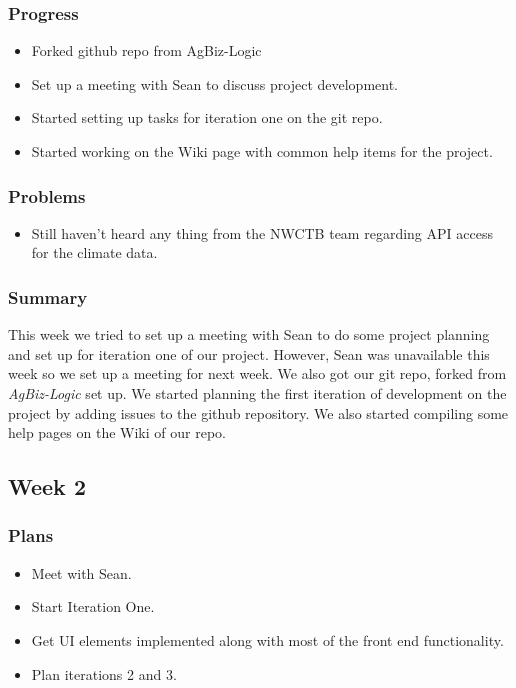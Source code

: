 \documentclass[onecolumn, draftclsnofoot,10pt, compsoc]{article}
\begin{document}
			\subsubsection{Progress}
				\begin{itemize}
					\item Forked github repo from AgBiz-Logic
					\item Set up a meeting with Sean to discuss project development.
					\item Started setting up tasks for iteration one on the git repo.
					\item Started working on the Wiki page with common help items for the project.
				\end{itemize}
			\subsubsection{Problems}
				\begin{itemize}
					\item Still haven't heard any thing from the NWCTB team regarding API access for the climate data.
				\end{itemize}

			\subsubsection{Summary}
			This week we tried to set up a meeting with Sean to do some project planning and set up for iteration one of our project. However, Sean was unavailable this week so we set up a meeting for next week. We also got our git repo, forked from \textit{AgBiz-Logic} set up. We started planning the first iteration of development on the project by adding issues to the github repository. We also started compiling some help pages on the Wiki of our repo.\\

		\subsection{Week 2}
			\subsubsection{Plans}
				\begin{itemize}
					\item Meet with Sean.
					\item Start Iteration One.
					\item Get UI elements implemented along with most of the front end functionality.
					\item Plan iterations 2 and 3.
				\end{itemize}
\end{document}
